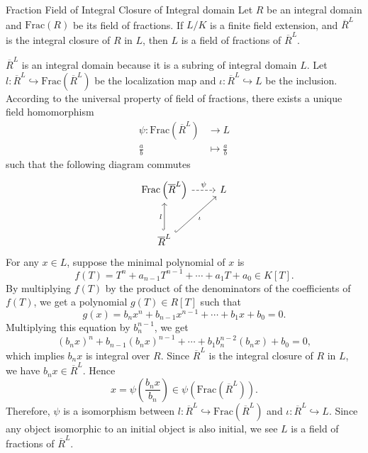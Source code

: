 \begin{proposition}{Fraction Field of Integral Closure of Integral domain}{}
    Let $R$ be an integral domain and $\mathrm{Frac}(R)$ be its field of fractions. If $L/K$ is a finite field extension, and $\overline{R}^L$ is the integral closure of $R$ in $L$, then $L$ is a field of fractions of $\overline{R}^L$.
\end{proposition}
\begin{prf}
    $\overline{R}^L$ is an integral domain because it is a subring of integral domain $L$. Let $l:\overline{R}^L\hookrightarrow \mathrm{Frac}\left(\overline{R}^L\right) $ be the localization map and $\iota:\overline{R}^L\hookrightarrow L$ be the inclusion. According to the universal property of field of fractions, there exists a unique field homomorphism 
    \begin{align*}
        \psi:\mathrm{Frac}\left(\overline{R}^L\right) &\longrightarrow L\\
        \frac{a}{b}&\longmapsto \frac{a}{b}
    \end{align*}
    such that the following diagram commutes
    \[
        \begin{tikzcd}
            \mathrm{Frac}\left(\overline{R}^L\right)  \arrow[r, "\psi", dashed]        & L \\[1em]
            \overline{R}^L \arrow[u, "l", hook] \arrow[ru, "\iota"', hook] &  
            \end{tikzcd}
    \]
    For any $x\in L$, suppose the minimal polynomial of $x$ is
    \[
    f(T) = T^n + a_{n-1}T^{n-1} + \cdots + a_1T + a_0 \in K[T].
    \]
    By multiplying $f(T)$ by the product of the denominators of the coefficients of $f(T)$, we get a polynomial $g(T)\in R[T]$ such that 
    \[
    g(x)=b_n x^n + b_{n-1}x^{n-1} + \cdots + b_1x + b_0 = 0.
    \]
    Multiplying this equation by $b_n^{n-1}$, we get
    \[
    (b_n x)^n + b_{n-1}(b_n x)^{n-1} + \cdots + b_1b_n^{n-2}(b_n x) + b_0 = 0,
    \]
    which implies $b_n x$ is integral over $R$. Since $\overline{R}^L$ is the integral closure of $R$ in $L$, we have $b_n x\in \overline{R}^L$. Hence 
    \[
    x=\psi\left(\frac{b_n x}{b_n}\right)\in \psi\left(\mathrm{Frac}\left(\overline{R}^L\right)\right).
    \]
    Therefore, $\psi$ is a isomorphism between $l:\overline{R}^L\hookrightarrow \mathrm{Frac}\left(\overline{R}^L\right) $ and $\iota:\overline{R}^L\hookrightarrow L$. Since any object isomorphic to an initial object is also initial, we see $L$ is a field of fractions of $\overline{R}^L$.
 
\end{prf}



